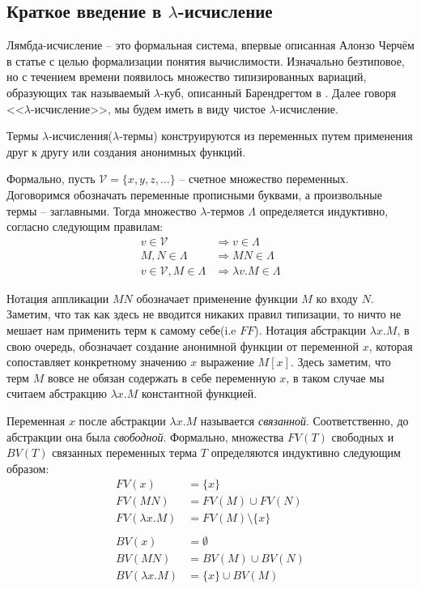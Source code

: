 \subsection{Краткое введение в \texorpdfstring{$\lambda$}{лямбда}-исчисление}

Лямбда-исчисление -- это формальная система, впервые описанная Алонзо Черчём в статье \cite{church1936unsolvable} с целью формализации понятия вычислимости. Изначально безтиповое, но с течением времени появилось множество типизированных вариаций, образующих так называемый $\lambda$-куб, описанный Барендрегтом в \cite{barendregt1993lambda}. Далее говоря <<$\lambda$-исчисление>>, мы будем иметь в виду чистое $\lambda$-исчисление.

Термы $\lambda$-исчисления($\lambda$-термы) конструируются из переменных путем применения друг к другу или создания анонимных функций.

Формально, пусть $\mathcal{V}=\{x,y,z,\dots\}$ -- счетное множество переменных. Договоримся обозначать переменные прописными буквами, а произвольные термы -- заглавными. Тогда множество $\lambda$-термов $\Lambda$ определяется индуктивно, согласно следующим правилам:
\begin{align*}
  v \in \mathcal{V} &\Rightarrow v \in \Lambda \\
  M, N \in \Lambda &\Rightarrow M N \in \Lambda \\
  v \in \mathcal{V}, M \in \Lambda &\Rightarrow \lambda v.M \in \Lambda
\end{align*}

Нотация аппликации $M N$ обозначает применение функции $M$ ко входу $N$. Заметим, что так как здесь не вводится никаких правил типизации, то ничто не мешает нам применить терм к самому себе(i.e $F F$). Нотация абстракции $\lambda x.M$, в свою очередь, обозначает создание анонимной функции от переменной $x$, которая сопоставляет конкретному значению $x$ выражение $M[x]$. Здесь заметим, что терм $M$ вовсе не обязан содержать в себе переменную $x$, в таком случае мы считаем абстракцию $\lambda x.M$ константной функцией.


Переменная $x$ после абстракции $\lambda x.M$ называется \textit{связанной}. Соответственно, до абстракции она была \textit{свободной}. Формально, множества $FV(T)$ свободных и $BV(T)$ связанных переменных терма $T$ определяются индуктивно следующим образом:
\begin{align*}
  FV(x) &= \{x\} \\
  FV(M N) &= FV(M) \cup FV(N) \\
  FV(\lambda x. M) &= FV(M) \setminus \{x\} \\
  \\
  BV(x) &= \emptyset \\
  BV(M N) &= BV(M) \cup BV(N) \\
  BV(\lambda x. M) &= \{x\} \cup BV(M)
\end{align*}

